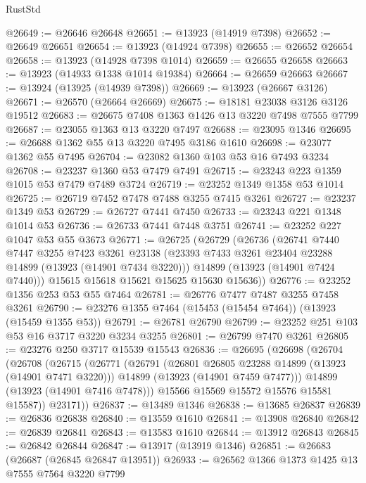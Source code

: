 \begin{lexlean}{RustStd}
\begin{coremodule}
@26649 := @26646 @26648
@26651 := @13923 (@14919 @7398)
@26652 := @26649 @26651
@26654 := @13923 (@14924 @7398)
@26655 := @26652 @26654
@26658 := @13923 (@14928 @7398 @1014)
@26659 := @26655 @26658
@26663 := @13923 (@14933 @1338 @1014 @19384)
@26664 := @26659 @26663
@26667 := @13924 (@13925 (@14939 @7398))
@26669 := @13923 (@26667 @3126)
@26671 := @26570 (@26664 @26669)
@26675 := @18181 @23038 @3126 @3126 @19512
@26683 := @26675 @7408 @1363 @1426 @13 @3220 @7498 @7555 @7799
@26687 := @23055 @1363 @13 @3220 @7497
@26688 := @23095 @1346
@26695 := @26688 @1362 @55 @13 @3220 @7495 @3186 @1610
@26698 := @23077 @1362 @55 @7495
@26704 := @23082 @1360 @103 @53 @16 @7493 @3234
@26708 := @23237 @1360 @53 @7479 @7491
@26715 := @23243 @223 @1359 @1015 @53 @7479 @7489 @3724
@26719 := @23252 @1349 @1358 @53 @1014
@26725 := @26719 @7452 @7478 @7488 @3255 @7415 @3261
@26727 := @23237 @1349 @53
@26729 := @26727 @7441 @7450
@26733 := @23243 @221 @1348 @1014 @53
@26736 := @26733 @7441 @7448 @3751
@26741 := @23252 @227 @1047 @53 @55 @3673
@26771 := @26725
    (@26729
      (@26736
        (@26741
          @7440
          @7447
          @3255
          @7423
          @3261
          @23138
          (@23393 @7433 @3261 @23404 @23288 @14899 (@13923 (@14901 @7434 @3220)))
          @14899
          (@13923 (@14901 @7424 @7440)))
        @15615
        @15618
        @15621
        @15625
        @15630
        @15636))
@26776 := @23252 @1356 @253 @53 @55 @7464
@26781 := @26776 @7477 @7487 @3255 @7458 @3261
@26790 := @23276 @1355 @7464 (@15453 (@15454 @7464)) (@13923 (@15459 @1355 @53))
@26791 := @26781 @26790
@26799 := @23252 @251 @103 @53 @16 @3717 @3220 @3234 @3255
@26801 := @26799 @7470 @3261
@26805 := @23276 @250 @3717 @15539 @15543
@26836 := @26695
    (@26698
      (@26704
        (@26708
          (@26715
            (@26771
              (@26791
                (@26801 @26805 @23288 @14899 (@13923 (@14901 @7471 @3220)))
                @14899
                (@13923 (@14901 @7459 @7477)))
              @14899
              (@13923 (@14901 @7416 @7478)))
            @15566
            @15569
            @15572
            @15576
            @15581
            @15587))
        @23171))
@26837 := @13489 @1346
@26838 := @13685 @26837
@26839 := @26836 @26838
@26840 := @13559 @1610
@26841 := @13908 @26840
@26842 := @26839 @26841
@26843 := @13583 @1610
@26844 := @13912 @26843
@26845 := @26842 @26844
@26847 := @13917 (@13919 @1346)
@26851 := @26683 (@26687 (@26845 @26847 @13951))
@26933 := @26562
    @1366
    @1373
    @1425
    @13
    @7555
    @7564
    @3220
    @7799

\end{coremodule}
\end{lexlean}
